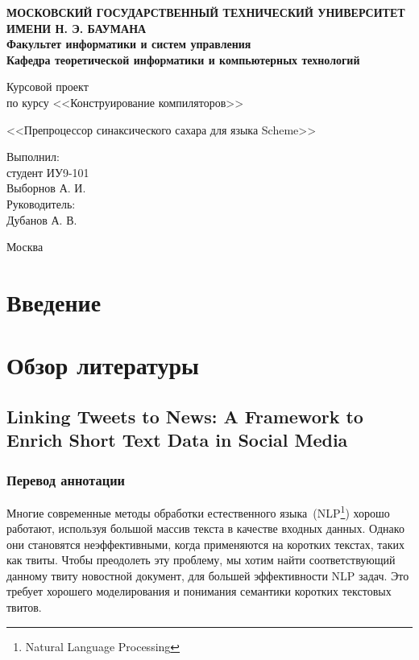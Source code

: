 \documentclass[12pt,a4paper,oneside]{extarticle}
\begin{document}
\pgfplotsset{compat=1.8}

\thispagestyle{empty}
\newpage
{
\centering


\textbf{
МОСКОВСКИЙ ГОСУДАРСТВЕННЫЙ ТЕХНИЧЕСКИЙ УНИВЕРСИТЕТ ИМЕНИ Н. Э. БАУМАНА \\
Факультет информатики и систем управления \\
Кафедра теоретической информатики и компьютерных технологий}
\bigskip
\bigskip
\bigskip
\bigskip
\bigskip
\bigskip
\bigskip

\vfill

Курсовой проект \\
по курсу <<Конструирование компиляторов>>

\bigskip

{\large <<Препроцессор синаксического сахара для языка Scheme>>}
\bigskip

\vfill



\hfill\parbox{4cm} {
Выполнил:\\
студент ИУ9-101 \hfill \\
Выборнов А. И.\hfill \medskip\\
Руководитель:\\
Дубанов А. В.\hfill
}


\vspace{\fill}

Москва \number\year
\clearpage
}


\tableofcontents

\clearpage

\section*{Введение}

\section{Обзор литературы}

    \subsection{Linking Tweets to News: A Framework to Enrich Short Text Data in Social Media}
        \subsubsection{Перевод аннотации}
        Многие современные методы обработки естественного языка~(NLP\footnote{Natural Language Processing}) хорошо работают, используя большой массив текста в качестве входных данных.
        Однако они становятся неэффективными, когда применяются на коротких текстах, таких как твиты.
        Чтобы преодолеть эту проблему, мы хотим найти соответствующий данному твиту новостной документ, для большей эффективности NLP задач.
        Это требует хорошего моделирования и понимания семантики коротких текстовых твитов.
\end{document}

